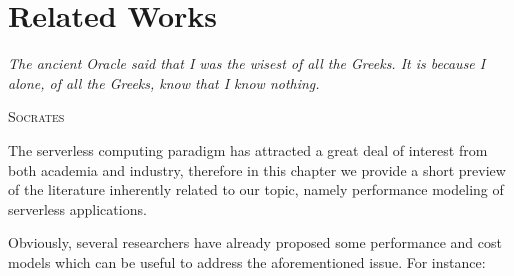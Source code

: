 \documentclass[12pt,a4paper]{report}
\begin{document}
\chapter{Related Works}\label{chapterRelated}

\epigraph{\itshape The ancient Oracle said that I was the wisest of all the Greeks. It is because I alone, of all the Greeks, know that I know nothing.}{\textsc{Socrates}}

The serverless computing paradigm has attracted a great deal of interest from both academia and industry, therefore in this chapter we provide a short preview of the literature inherently related to our topic, namely performance modeling
of serverless applications.

Obviously, several researchers have already proposed some  performance and cost models which can be useful to address the aforementioned issue. For instance: 
\end{document}
